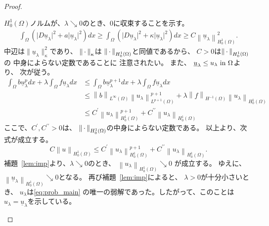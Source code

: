 \begin{proof}
\begin{enumerate}[1.]
        $H_0^1(\Omega)$ノルムが、$\lambda \searrow
        0$のとき、$0$に収束することを示す。
        \begin{align*}
         \int_\Omega \left( \lvert D\underline{u}_\lambda \rvert^2 + a
                      \lvert \underline{u}_\lambda \rvert^2 \right) dx 
         \geq 
         \int_\Omega \left( \lvert
         D\underline{u}_\lambda
         \rvert^2 +
         \kappa \lvert \underline{u}_\lambda \rvert^2 \right) dx 
         \geq C
         \left\| \underline{u}_\lambda \right\|_{H_0^1(\Omega)}^2.
        \end{align*}
        中辺は$\| \underline{u}_\lambda \|_\kappa^2$であり、
        $\left\|\, \cdot \, \right\|_{\kappa}$は
        $\left\|\, \cdot \, \right\|_{H_0^1(\Omega)}$と同値であるから、
        $C > 0$は$\left\|\, \cdot \, \right\|_{H_0^1(\Omega)}$の
        中身によらない定数であることに
        注意されたい。
        また、
        $\underline{u}_\lambda \leq u_\lambda ~\text{in}~ \Omega$より、
        次が従う。
        \begin{align*}
         \int_\Omega b\underline{u}_\lambda^p dx 
          + \lambda \int_\Omega f \underline{u}_\lambda dx
         &\leq \int_\Omega b \underline{u}_\lambda^{p+1}
         dx + \lambda \int_\Omega f \underline{u}_\lambda dx \\
         &\leq \left\| b \right\|_{L^\infty(\Omega)} \left\|
         u_\lambda \right\|_{L^{p+1}(\Omega)}^{p+1} +
         \lambda \left\| f \right\|_{H^{-1}(\Omega)} \left\|
         u_\lambda \right\|_{H^1_0(\Omega)} \\
         &\leq C^\prime \left\|
         u_\lambda \right\|_{H_0^1(\Omega)}^{p+1} +
         C^{\prime\prime} \left\| u_\lambda
         \right\|_{H_0^1(\Omega)}
        \end{align*}
        ここで、$C^\prime, C^{\prime\prime} > 0$は、
        $\left\|\, \cdot \, \right\|_{H_0^1(\Omega)}$の中身によらない定数である。
        以上より、次式が成立する。
        \[
         C
        \left\| u \right\|_{H_0^1(\Omega)} \leq 
        C^\prime \left\|
        u_\lambda \right\|_{H_0^1(\Omega)}^{p+1} +
        C^{\prime\prime}
        \left\| u_\lambda \right\|_{H_0^1(\Omega)}.
        \]
        補題~\ref{lem:imp}より、$\lambda \searrow 0$のとき、
        $\left\| u_\lambda \right\|_{H_0^1(\Omega)} \searrow 0$
        が成立する。
        ゆえに、$\left\| \underline{u}_\lambda
        \right\|_{H_0^1(\Omega)}
        \searrow 0$となる。
        再び補題~\ref{lem:imp}によると、
        $\lambda > 0$が十分小さいとき、
        $u_\lambda$は\ref{eq:prob_main}
        の唯一の弱解であった。したがって、このことは
        $u_\lambda = \underline{u}_\lambda$を示している。 \qedhere
 \end{enumerate}
\end{proof}


